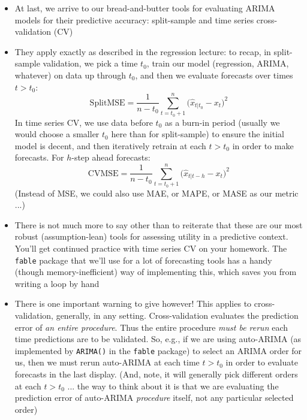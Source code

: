 \documentclass{article}
\begin{document}
\def\SplitMSE{\mathrm{SplitMSE}} 
\def\CVMSE{\mathrm{CVMSE}}

\begin{itemize}
\item At last, we arrive to our bread-and-butter tools for evaluating ARIMA  
  models for their predictive accuracy: split-sample and time series
  cross-validation (CV) 

\item They apply exactly as described in the regression lecture: to recap, in
  split-sample validation, we pick a time $t_0$, train our model (regression,
  ARIMA, whatever) on data up through $t_0$, and then we evaluate forecasts  
   over times $t > t_0$:
  \[
  \SplitMSE = \frac{1}{n-t_0} \sum_{t = t_0+1}^n \big( \hat{x}_{t | t_0} - x_t
  \big)^2   
  \]
  In time series CV, we use data before $t_0$ as a burn-in period (usually we
  would choose a smaller $t_0$ here than for split-sample) to ensure the initial
  model is decent, and then iteratively retrain at each $t > t_0$ in order to
  make forecasts. For $h$-step ahead forecasts:    
  \[
  \CVMSE = \frac{1}{n-t_0} \sum_{t = t_0+1}^n \big( \hat{x}_{t | t-h} - x_t
  \big)^2    
  \]
  (Instead of MSE, we could also use MAE, or MAPE, or MASE as our metric ...) 

\item There is not much more to say other than to reiterate that these are our
  most robust (assumption-lean) tools for assessing utility in a predictive 
  context. You'll get continued practice with time series CV on your
  homework. The \verb|fable| package that we'll use for a lot of forecasting
  tools has a handy (though memory-inefficient) way of implementing this, which
  saves you from writing a loop by hand 

\item There is one important warning to give however! This applies to
  cross-validation, generally, in any setting. Cross-validation evaluates the
  prediction error of \emph{an entire procedure}. Thus the entire procedure
  \emph{must be rerun} each time predictions are to be validated. So, e.g., if
  we are using auto-ARIMA (as implemented by \verb|ARIMA()| in the \verb|fable|
  package) to select an ARIMA order for us, then we must rerun auto-ARIMA at
  each time $t > t_0$ in order to evaluate forecasts in the last display. (And,
  note, it will generally pick different orders at each $t > t_0$ ... the way to
  think about it is that we are evaluating the prediction error of auto-ARIMA 
  \emph{procedure} itself, not any particular selected order) 


\end{itemize}
\end{document}
